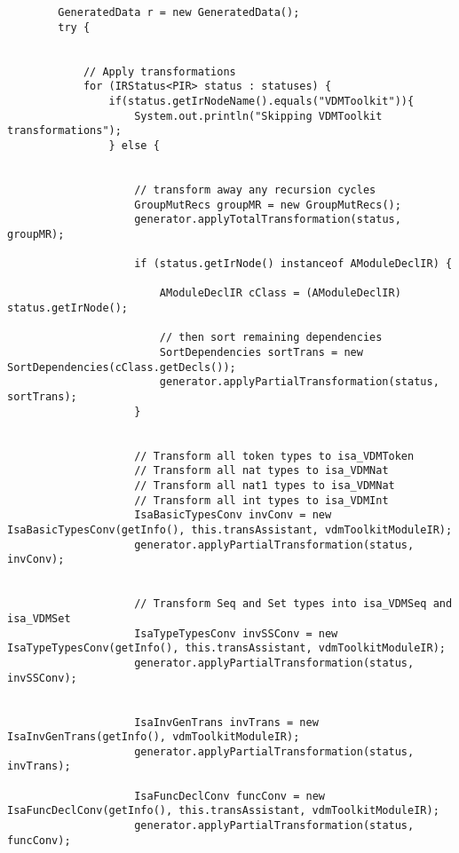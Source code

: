 \begin{appendices}
\begin{lstlisting}
        GeneratedData r = new GeneratedData();
        try {


            // Apply transformations
            for (IRStatus<PIR> status : statuses) {
                if(status.getIrNodeName().equals("VDMToolkit")){
                    System.out.println("Skipping VDMToolkit transformations");
                } else {


                    // transform away any recursion cycles
                    GroupMutRecs groupMR = new GroupMutRecs();
                    generator.applyTotalTransformation(status, groupMR);
                    
                    if (status.getIrNode() instanceof AModuleDeclIR) {
                      
                        AModuleDeclIR cClass = (AModuleDeclIR) status.getIrNode();
                        
                        // then sort remaining dependencies
                        SortDependencies sortTrans = new SortDependencies(cClass.getDecls());
                        generator.applyPartialTransformation(status, sortTrans);
                    }
                    
                    
                    // Transform all token types to isa_VDMToken
                    // Transform all nat types to isa_VDMNat
                    // Transform all nat1 types to isa_VDMNat
                    // Transform all int types to isa_VDMInt
                    IsaBasicTypesConv invConv = new IsaBasicTypesConv(getInfo(), this.transAssistant, vdmToolkitModuleIR);
                    generator.applyPartialTransformation(status, invConv);
                    
                    
                    // Transform Seq and Set types into isa_VDMSeq and isa_VDMSet
                    IsaTypeTypesConv invSSConv = new IsaTypeTypesConv(getInfo(), this.transAssistant, vdmToolkitModuleIR);
                    generator.applyPartialTransformation(status, invSSConv);
                    
                    
                    IsaInvGenTrans invTrans = new IsaInvGenTrans(getInfo(), vdmToolkitModuleIR);
                    generator.applyPartialTransformation(status, invTrans);
                    
                    IsaFuncDeclConv funcConv = new IsaFuncDeclConv(getInfo(), this.transAssistant, vdmToolkitModuleIR);
                    generator.applyPartialTransformation(status, funcConv);
                    

\end{lstlisting}
\end{appendices}
